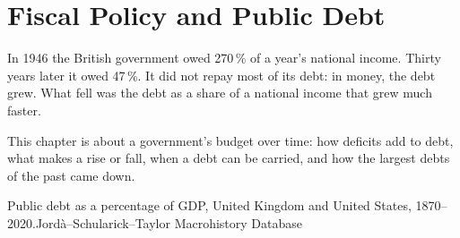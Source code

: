 \chapter{Fiscal Policy and Public Debt}\label{ch:g12:fiscal-policy-and-debt}

In 1946 the British government owed 270\,\% of a year's national income. Thirty years later it owed 47\,\%. It did not repay most of its debt: in money, the debt grew.
What fell was the debt as a share of a national income that grew much faster.

This chapter is about a government's budget over time: how deficits add to debt, what makes a  rise or fall, when a debt can be carried, and how the largest
debts of the past came down.

\begin{openingchart}{Public debt as a percentage of GDP, United Kingdom and United States, 1870--2020.}{Jordà--Schularick--Taylor Macrohistory Database}
\end{openingchart}

